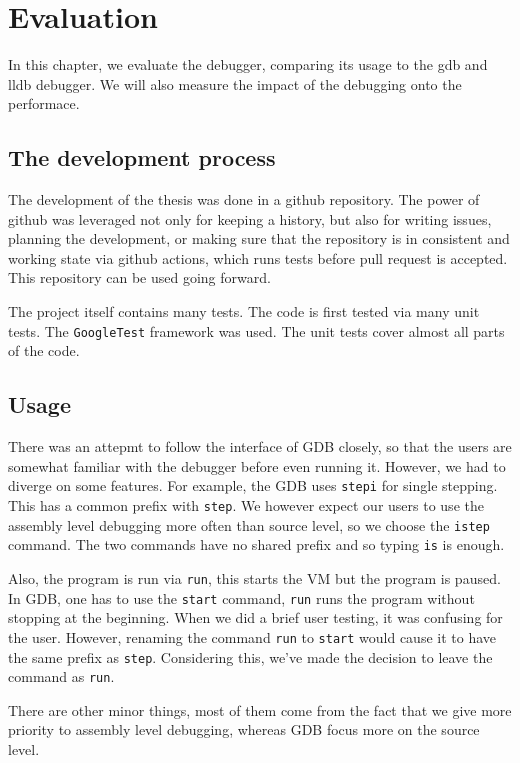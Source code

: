 \chapter{Evaluation}
In this chapter, we evaluate the debugger, comparing its usage to the gdb and
lldb debugger. We will also measure the impact of the debugging onto the
performace.

\section{The development process}
The development of the thesis was done in a github repository. The power of
github was leveraged not only for keeping a history, but also for writing
issues, planning the development, or making sure that the repository is in
consistent and working state via github actions, which runs tests before pull
request is accepted. This repository can be used going forward.

The project itself contains many tests. The code is first tested via many unit
tests. The \texttt{GoogleTest} framework was used. The unit tests cover almost
all parts of the code.

\section{Usage}
There was an attepmt to follow the interface of GDB closely, so that the users
are somewhat familiar with the debugger before even running it. However, we had
to diverge on some features. For example, the GDB uses \texttt{stepi} for
single stepping. This has a common prefix with \texttt{step}. We however expect
our users to use the assembly level debugging more often than source level, so
we choose the \texttt{istep} command. The two commands have no shared prefix
and so typing \texttt{is} is enough.

Also, the program is run via \texttt{run}, this starts the VM but the program
is paused. In GDB, one has to use the \texttt{start} command, \texttt{run} runs
the program without stopping at the beginning. When we did a brief user
testing, it was confusing for the user. However, renaming the command
\texttt{run} to \texttt{start} would cause it to have the same prefix as
\texttt{step}. Considering this, we've made the decision to leave the command
as \texttt{run}.

There are other minor things, most of them come from the fact that we give more
priority to assembly level debugging, whereas GDB focus more on the source
level.
